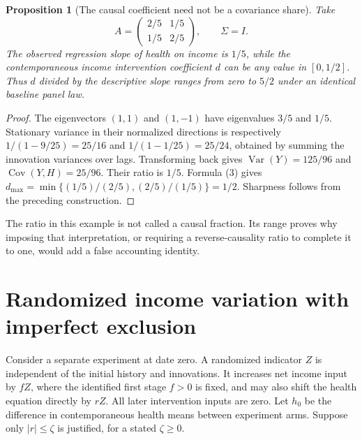 \documentclass[11pt,a4paper]{article}
\newtheorem{proposition}[theorem]{Proposition}
\theoremstyle{remark}
\DeclareMathOperator{\Var}{Var}
\begin{document}
\begin{proposition}[The causal coefficient need not be a covariance share]
Take
\[
 A=\begin{pmatrix}2/5&1/5\\1/5&2/5\end{pmatrix},\qquad\Sigma=I.
\]
The observed regression slope of health on income is $1/5$, while the contemporaneous income intervention coefficient $d$ can be any value in $[0,1/2]$. Thus $d$ divided by the descriptive slope ranges from zero to $5/2$ under an identical baseline panel law.
\end{proposition}
\begin{proof}
The eigenvectors $(1,1)$ and $(1,-1)$ have eigenvalues $3/5$ and $1/5$. Stationary variance in their normalized directions is respectively $1/(1-9/25)=25/16$ and $1/(1-1/25)=25/24$, obtained by summing the innovation variances over lags. Transforming back gives $\Var(Y)=125/96$ and $\operatorname{Cov}(Y,H)=25/96$. Their ratio is $1/5$. Formula (3) gives $d_{\max}=\min\{(1/5)/(2/5),(2/5)/(1/5)\}=1/2$. Sharpness follows from the preceding construction.
\end{proof}
The ratio in this example is not called a causal fraction. Its range proves why imposing that interpretation, or requiring a reverse-causality ratio to complete it to one, would add a false accounting identity.

\section{Randomized income variation with imperfect exclusion}
Consider a separate experiment at date zero. A randomized indicator $Z$ is independent of the initial history and innovations. It increases net income input by $fZ$, where the identified first stage $f>0$ is fixed, and may also shift the health equation directly by $rZ$. All later intervention inputs are zero. Let $h_0$ be the difference in contemporaneous health means between experiment arms. Suppose only $|r|\le\zeta$ is justified, for a stated $\zeta\ge0$.
\end{document}
